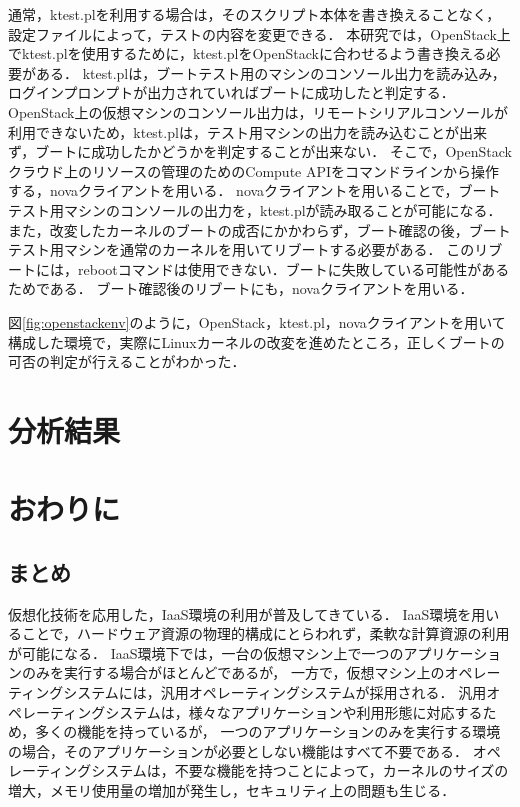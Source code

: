 \documentclass[graduation-thesis]{mlarticle}
\begin{document}
通常，ktest.plを利用する場合は，そのスクリプト本体を書き換えることなく，設定ファイルによって，テストの内容を変更できる．
本研究では，OpenStack上でktest.plを使用するために，ktest.plをOpenStackに合わせるよう書き換える必要がある．
ktest.plは，ブートテスト用のマシンのコンソール出力を読み込み，ログインプロンプトが出力されていればブートに成功したと判定する．
OpenStack上の仮想マシンのコンソール出力は，リモートシリアルコンソールが利用できないため，ktest.plは，テスト用マシンの出力を読み込むことが出来ず，ブートに成功したかどうかを判定することが出来ない．
そこで，OpenStackクラウド上のリソースの管理のためのCompute APIをコマンドラインから操作する，novaクライアントを用いる．
novaクライアントを用いることで，ブートテスト用マシンのコンソールの出力を，ktest.plが読み取ることが可能になる．
また，改変したカーネルのブートの成否にかかわらず，ブート確認の後，ブートテスト用マシンを通常のカーネルを用いてリブートする必要がある．
このリブートには，rebootコマンドは使用できない．ブートに失敗している可能性があるためである．
ブート確認後のリブートにも，novaクライアントを用いる．

図\ref{fig:openstackenv}のように，OpenStack，ktest.pl，novaクライアントを用いて構成した環境で，実際にLinuxカーネルの改変を進めたところ，正しくブートの可否の判定が行えることがわかった．


\section{分析結果}
\label{result}



\section{おわりに}

\subsection{まとめ}
仮想化技術を応用した，IaaS環境の利用が普及してきている．
IaaS環境を用いることで，ハードウェア資源の物理的構成にとらわれず，柔軟な計算資源の利用が可能になる．
IaaS環境下では，一台の仮想マシン上で一つのアプリケーションのみを実行する場合がほとんどであるが，
一方で，仮想マシン上のオペレーティングシステムには，汎用オペレーティングシステムが採用される．
汎用オペレーティングシステムは，様々なアプリケーションや利用形態に対応するため，多くの機能を持っているが，
一つのアプリケーションのみを実行する環境の場合，そのアプリケーションが必要としない機能はすべて不要である．
オペレーティングシステムは，不要な機能を持つことによって，カーネルのサイズの増大，メモリ使用量の増加が発生し，セキュリティ上の問題も生じる．
\end{document}
